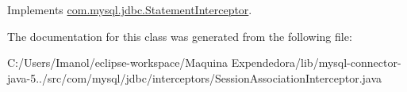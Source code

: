 Implements \mbox{\hyperlink{interfacecom_1_1mysql_1_1jdbc_1_1_statement_interceptor_ae8b6b08014d450768f3f7088f43ce593}{com.\+mysql.\+jdbc.\+Statement\+Interceptor}}.



The documentation for this class was generated from the following file\+:\begin{DoxyCompactItemize}
\item 
C\+:/\+Users/\+Imanol/eclipse-\/workspace/\+Maquina Expendedora/lib/mysql-\/connector-\/java-\/5../src/com/mysql/jdbc/interceptors/Session\+Association\+Interceptor.\+java\end{DoxyCompactItemize}
